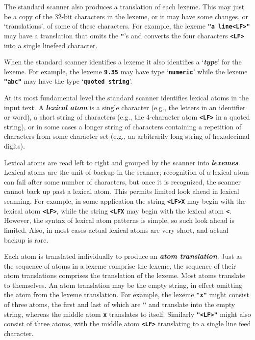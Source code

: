 \documentclass[12pt]{article}
\newcommand{\TT}[1]{{\tt \bfseries #1}}
\newcommand{\key}[1]{{\bf \em #1}\index{#1}}
\newcommand{\mkey}[2]{{\bf \em #1}\index{#1!#2}}
\newcommand{\skey}[2]{{\bf \em #1#2}\index{#1}}
\begin{document}
The standard scanner also produces a translation of each
lexeme.  This may just be a copy of the 32-bit characters
in the lexeme, or it may have some changes, or `translations',
of some of these characters.  For example, the lexeme
\TT{"a line<LF>"} may have a translation that omits the
\TT{"}'s and converts the four characters \TT{<LF>} into
a single linefeed character.

When the standard scanner identifies a lexeme it also identifies
a `\mkey{type}{of lexeme}' for the lexeme.
For example, the lexeme \TT{9.35} may have type `\TT{numeric}'
while the lexeme \TT{"abc"} may have the type `\TT{quoted string}'.

At its most fundamental level the
standard scanner identifies lexical atoms in the input text.
A \key{lexical atom} is a single character (e.g., the letters
in an identifier or word), a short string of characters
(e.g., the 4-character atom \TT{<LF>} in a quoted string),
or in some cases a longer string of characters containing
a repetition of characters from some character set (e.g., an arbitrarily
long string of hexadecimal digits).

Lexical atoms are read left to right and
grouped by the scanner into \skey{lexeme}s.
Lexical atoms are the unit of backup in the scanner; recognition
of a lexical atom can fail after some number of characters, but
once it is recognized, the scanner cannot back up past a lexical atom.
This permits limited look ahead in lexical scanning.  For example,
in some application
the string \TT{<LF>X} may begin with the lexical atom \TT{<LF>},
while the string \TT{<LFX} may begin with the lexical atom \TT{<}.
However, the syntax of lexical atom patterns is simple, so such
look ahead is limited.  Also, in most cases actual
lexical atoms are very short, and actual backup is rare.

Each atom is translated individually to produce an
\key{atom translation}.  Just as the sequence of atoms in a lexeme
comprise the lexeme, the sequence of their atom translations
comprises the translation of the lexeme.  Most atoms translate
to themselves.  An atom translation
may be the empty string, in effect omitting the atom from the
lexeme translation.  For example, the lexeme \TT{"x"} might
consist of three atoms, the first and last of which are \TT{"}
and translate into the empty string, whereas the middle atom
\TT{x} translates to itself.  Similarly \TT{"<LF>"} might also
consist of three atoms, with the middle atom \TT{<LF>} translating
to a single line feed character.
\end{document}
